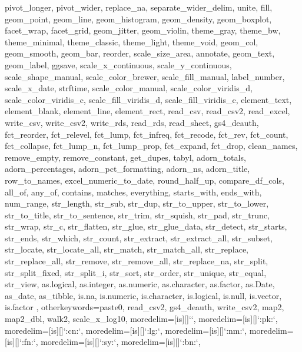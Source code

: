 {{		%
		pivot_longer, pivot_wider, replace_na, separate_wider_delim, unite, fill,
		geom_point, geom_line, geom_histogram, geom_density, geom_boxplot,
		facet_wrap, facet_grid, geom_jitter, geom_violin, theme_gray, theme_bw, theme_minimal, theme_classic, theme_light, theme_void, geom_col, geom_smooth, geom_bar, reorder, scale_size_area, annotate, geom_text, geom_label, ggsave, scale_x_continuous, scale_y_continuous, scale_shape_manual, scale_color_brewer, scale_fill_manual, label_number, scale_x_date, strftime, scale_color_manual, scale_color_viridis_d, scale_color_viridis_c, scale_fill_viridis_d, scale_fill_viridis_c, element_text, element_blank, element_line, element_rect,
		read_csv, read_csv2, read_excel, write_csv, write_csv2, write_rds, read_rds, read_sheet, gs4_deauth,
		fct_reorder, fct_relevel, fct_lump, fct_infreq, fct_recode, fct_rev, fct_count, fct_collapse, fct_lump_n, fct_lump_prop, fct_expand, fct_drop,
		clean_names, remove_empty, remove_constant, get_dupes, tabyl, adorn_totals, adorn_percentages, adorn_pct_formatting, adorn_ns, adorn_title, row_to_names, excel_numeric_to_date, round_half_up, compare_df_cols,
		all_of, any_of, contains, matches, everything,
		starts_with, ends_with, num_range,
		str_length, str_sub, str_dup,
		str_to_upper, str_to_lower, str_to_title, str_to_sentence,
		str_trim, str_squish, str_pad, str_trunc, str_wrap,
		str_c, str_flatten, str_glue, str_glue_data,
		str_detect, str_starts, str_ends, str_which, str_count,
		str_extract, str_extract_all, str_subset,
		str_locate, str_locate_all, str_match, str_match_all,
		str_replace, str_replace_all, str_remove, str_remove_all, str_replace_na,
		str_split, str_split_fixed, str_split_i,
		str_sort, str_order, str_unique, str_equal, str_view,
		as.logical, as.integer, as.numeric, as.character, as.factor, as.Date, as_date, as_tibble,
		is.na, is.numeric, is.character, is.logical, is.null, is.vector, is.factor
	},
	otherkeywords={paste0, read_csv2, gs4_deauth, write_csv2, map2, map2_dbl, walk2, scale_x_log10},
	moredelim=[is][\lst@r@normalstyle]{`}{`},
	moredelim=[is][\lst@r@normalstyle]{`:pk:}{`}, %
	moredelim=[is][\lst@r@consolestyle]{`:cn:}{`}, %
	moredelim=[is][\lst@r@booleanstyle]{`:lg:}{`}, %
	moredelim=[is][\lst@r@numberstyle]{`:nm:}{`}, %
	moredelim=[is][\lst@r@functionstyle]{`:fn:}{`}, %
	moredelim=[is][\lst@r@symbolstyle]{`:sy:}{`}, %
	moredelim=[is][\lst@r@symbolstyle]{`:bn:}{`}, %
}
